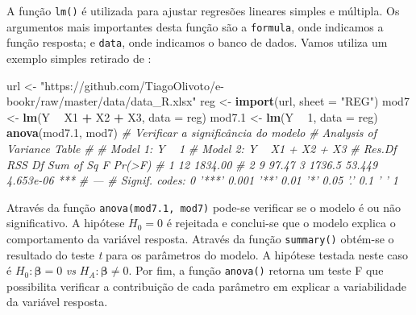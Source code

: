 \documentclass[
]{book}
\newenvironment{Shaded}{\begin{snugshade}}{\end{snugshade}}
\newcommand{\CommentTok}[1]{\textcolor[rgb]{0.56,0.35,0.01}{\textit{#1}}}
\newcommand{\DataTypeTok}[1]{\textcolor[rgb]{0.13,0.29,0.53}{#1}}
\newcommand{\DecValTok}[1]{\textcolor[rgb]{0.00,0.00,0.81}{#1}}
\newcommand{\FloatTok}[1]{\textcolor[rgb]{0.00,0.00,0.81}{#1}}
\newcommand{\KeywordTok}[1]{\textcolor[rgb]{0.13,0.29,0.53}{\textbf{#1}}}
\newcommand{\NormalTok}[1]{#1}
\newcommand{\OperatorTok}[1]{\textcolor[rgb]{0.81,0.36,0.00}{\textbf{#1}}}
\newcommand{\StringTok}[1]{\textcolor[rgb]{0.31,0.60,0.02}{#1}}
\begin{document}
A função \texttt{lm()}  é utilizada para ajustar regresões lineares simples e múltipla. Os argumentos mais importantes desta função são a \texttt{formula}, onde indicamos a função resposta; e \texttt{data}, onde indicamos o banco de dados. Vamos utiliza um exemplo simples retirado de \citet{Schneider2009}:

\begin{Shaded}
\begin{Highlighting}[]
\NormalTok{url <-}\StringTok{ "https://github.com/TiagoOlivoto/e-bookr/raw/master/data/data_R.xlsx"}
\NormalTok{reg <-}\StringTok{ }\KeywordTok{import}\NormalTok{(url, }\DataTypeTok{sheet =} \StringTok{"REG"}\NormalTok{)}
\NormalTok{mod7 <-}\StringTok{ }\KeywordTok{lm}\NormalTok{(Y }\OperatorTok{~}\StringTok{ }\NormalTok{X1 }\OperatorTok{+}\StringTok{ }\NormalTok{X2 }\OperatorTok{+}\StringTok{ }\NormalTok{X3, }\DataTypeTok{data =}\NormalTok{ reg)}
\NormalTok{mod7}\FloatTok{.1}\NormalTok{ <-}\StringTok{ }\KeywordTok{lm}\NormalTok{(Y }\OperatorTok{~}\StringTok{ }\DecValTok{1}\NormalTok{, }\DataTypeTok{data =}\NormalTok{ reg)}
\KeywordTok{anova}\NormalTok{(mod7}\FloatTok{.1}\NormalTok{, mod7) }\CommentTok{# Verificar a significância do modelo}
\CommentTok{# Analysis of Variance Table}
\CommentTok{# }
\CommentTok{# Model 1: Y ~ 1}
\CommentTok{# Model 2: Y ~ X1 + X2 + X3}
\CommentTok{#   Res.Df     RSS Df Sum of Sq      F    Pr(>F)    }
\CommentTok{# 1     12 1834.00                                  }
\CommentTok{# 2      9   97.47  3    1736.5 53.449 4.653e-06 ***}
\CommentTok{# ---}
\CommentTok{# Signif. codes:  0 '***' 0.001 '**' 0.01 '*' 0.05 '.' 0.1 ' ' 1}
\end{Highlighting}
\end{Shaded}

Através da função \texttt{anova(mod7.1,\ mod7)}  pode-se verificar se o modelo é ou não significativo. A hipótese \(H_0 = 0\) é rejeitada e conclui-se que o modelo explica o comportamento da variável resposta. Através da função \texttt{summary()}  obtém-se o resultado do teste \emph{t} para os parâmetros do modelo. A hipótese testada neste caso é \(H_0:\boldsymbol{\beta} = 0\) \emph{vs} \(H_A:\boldsymbol{\beta}\ne 0\). Por fim, a função \texttt{anova()} retorna um teste F que possibilita verificar a contribuição de cada parâmetro em explicar a variabilidade da variável resposta.
\end{document}
